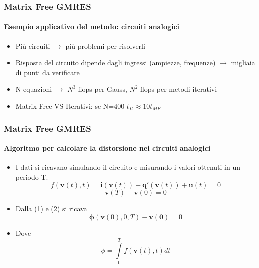 \documentclass[10pt]{beamer}
\begin{document}
\begin{frame}
\frametitle{Matrix Free GMRES}\framesubtitle{Esempio applicativo del metodo: \textbf{circuiti analogici}}
\begin{itemize}
\item Più circuiti $\to$ più problemi per risolverli
\item Risposta del circuito dipende dagli ingressi (ampiezze, frequenze) $\to$ migliaia di punti da verificare
\item N equazioni $\to$ $N^3$ flops per Gauss, $N^2$ flops per metodi iterativi
\item Matrix-Free VS Iterativi: se N=400 $t_{It} \approx 10t_{MF}$
\end{itemize}
\end{frame}


\begin{frame}
\frametitle{Matrix Free GMRES}\framesubtitle{Algoritmo per calcolare la distorsione nei circuiti analogici}
\begin{itemize}
\item I dati si ricavano simulando il circuito e misurando i valori ottenuti in un periodo T.
\begin{equation}
f(\mathbf{v}(t),t) = \mathbf{i}(\mathbf{v}(t)) + \mathbf{q}'(\mathbf{v}(t)) + \mathbf{u}(t) = 0	           
\end{equation}
\begin{equation}
\mathbf{v}(T) - \mathbf{v}(0) = 0 
\end{equation}
\item Dalla (1) e (2) si ricava  \begin{equation}
\mathbf{\phi}(\mathbf{v}(0),0,T) - \mathbf{v(0)}
 = 0
 \end{equation}
\item Dove \[ \phi = \int\limits_0^T f(\mathbf{v}(t),t) dt\]
\end{itemize}
\end{frame}
\end{document}
